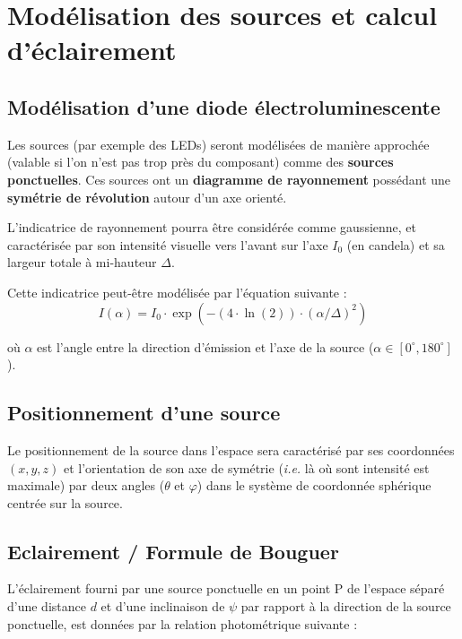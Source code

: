 \section{Modélisation des sources et calcul d'éclairement}

\subsection{Modélisation d'une diode électroluminescente}


Les sources (par exemple des LEDs) seront modélisées de manière approchée (valable si l'on n'est pas trop près du composant) comme des \textbf{sources ponctuelles}. Ces sources ont un \textbf{diagramme de rayonnement} possédant une \textbf{symétrie de révolution} autour d'un axe orienté. 

\medskip

L'indicatrice de rayonnement pourra être considérée comme gaussienne, et caractérisée par son intensité visuelle vers l'avant sur l'axe $I_0$ (en candela) et sa largeur totale à mi-hauteur $\Delta$.

Cette indicatrice peut-être modélisée par l'équation suivante : $$I(\alpha) = I_0 \cdot \exp(-(4 \cdot \ln(2)) \cdot (\alpha/\Delta)^2)$$

où $\alpha$ est l'angle entre la direction d'émission et l'axe de la source ($\alpha \in [0^{\circ}, 180^{\circ}]$). 

\medskip

\subsection{Positionnement d'une source}

Le positionnement de la source dans l'espace sera caractérisé par ses coordonnées $(x, y, z)$ et l'orientation de son axe de symétrie (\textit{i.e.} là où sont intensité est maximale) par deux angles ($\theta$ et $\varphi$) dans le système de coordonnée sphérique centrée sur la source. 
	
\medskip

\subsection{Eclairement / Formule de Bouguer}

L'éclairement fourni par une source ponctuelle en un point P de l'espace séparé d'une distance $d$ et d'une inclinaison de $\psi$ par rapport à la direction de la source ponctuelle, est données par la relation photométrique suivante : 

